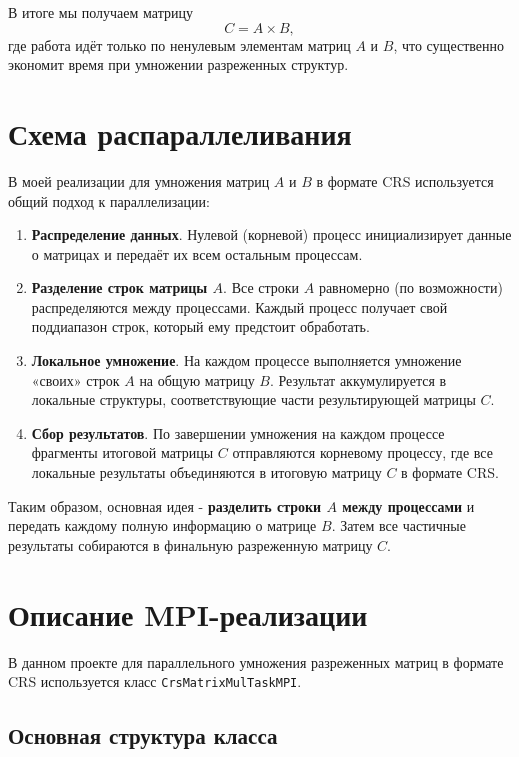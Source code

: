 \documentclass[12pt]{article}
\begin{document}
В итоге мы получаем матрицу 
\[
C = A \times B,
\]
где работа идёт только по ненулевым элементам матриц \(A\) и \(B\), что существенно экономит время при умножении разреженных структур.

\section{Схема распараллеливания}

В моей реализации для умножения матриц \(A\) и \(B\) в формате CRS используется общий подход к параллелизации:

\begin{enumerate}
    \item \textbf{Распределение данных}. 
    Нулевой (корневой) процесс инициализирует данные о матрицах и передаёт их всем остальным процессам.

    \item \textbf{Разделение строк матрицы \(A\)}. 
    Все строки \(A\) равномерно (по возможности) распределяются между процессами. Каждый процесс получает свой поддиапазон строк, который ему предстоит обработать.

    \item \textbf{Локальное умножение}. 
    На каждом процессе выполняется умножение «своих» строк \(A\) на общую матрицу \(B\). Результат аккумулируется в локальные структуры, соответствующие части результирующей матрицы \(C\).

    \item \textbf{Сбор результатов}. 
    По завершении умножения на каждом процессе фрагменты итоговой матрицы \(C\) отправляются корневому процессу, где все локальные результаты объединяются в итоговую матрицу \(C\) в формате CRS.
\end{enumerate}

Таким образом, основная идея - \textbf{разделить строки \(A\) между процессами} и передать каждому полную информацию о матрице \(B\). Затем все частичные результаты собираются в финальную разреженную матрицу \(C\). 


\section{Описание MPI-реализации}

В данном проекте для параллельного умножения разреженных матриц в формате CRS используется класс 
\texttt{CrsMatrixMulTaskMPI}.

\subsection{Основная структура класса}
\end{document}
